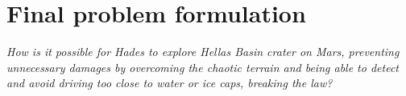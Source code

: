 \chapter{Final problem formulation}\label{ch:finalproblem}
\textit{How is it possible for Hades to explore Hellas Basin crater on Mars, preventing unnecessary damages by overcoming the chaotic terrain and being able to detect and avoid driving too close to water or ice caps, breaking the law?}







